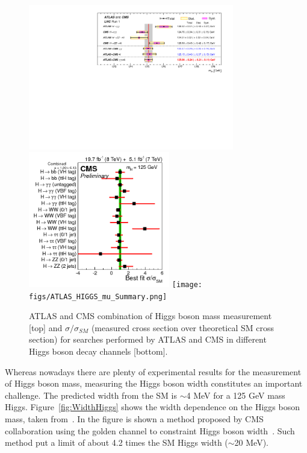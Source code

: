 \begin{figure}[!Hhtbp]
  \begin{center}
    \includegraphics[trim=10cm 7cm 1cm 1cm, clip=true, width=0.8\textwidth]{figs/LHC_combined_obs_unblind_summary_a1_final.png}
    \includegraphics[width=0.55\textwidth]{figs/sqr_mlz_ccc_mH125.png}
    \texttt{[image: figs/ATLAS\_HIGGS\_mu\_Summary.png]}
    \caption{ATLAS and CMS combination of Higgs boson mass measurement [top] and $\sigma/\sigma_{SM}$ (measured cross section over theoretical SM cross section) for searches performed by ATLAS and CMS in different Higgs boson decay channels [bottom].}
    \label{fig:HiggsMass}
  \end{center}
\end{figure}

Whereas nowadays there are plenty of experimental results for the measurement of Higgs boson mass, measuring the Higgs boson width constitutes an important challenge. The predicted width from the SM is $\sim$4 MeV for a 125 GeV mass Higgs. Figure~\ref{fig:WidthHiggs} shows the width dependence on the Higgs boson mass, taken from~\cite{Dittmaier:2011ti, Dittmaier:2012vm, Heinemeyer:2013tqa, HIGGSXSWG}. In the figure is shown a method proposed by CMS collaboration using the golden channel to constraint Higgs boson width~\cite{CMS-PAS-HIG-14-002, Khachatryan:2014iha}. Such method put a limit of about 4.2 times the SM Higgs width ($\sim$20 MeV).

